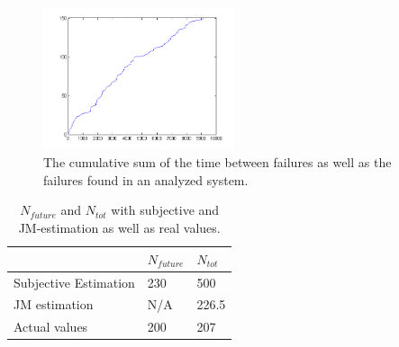 \begin{figure}[htb!]
\begin{center}
	\includegraphics[width=0.5\textwidth]{cumsumjmdata1plot.png}
\caption{The cumulative sum of the time between failures as well as the failures found in an analyzed system.}
\end{center}
\label{cumulativejmdata1}
\end{figure}

\begin{table}[!htb]
	\centering
	\caption{$N_{future}$ and $N_{tot}$ with subjective and JM-estimation as well as real values.}
	\label{jelinskimorandatable}	
    \begin{tabular}{|l|l|l|}
        \hline
        ~ & $N_{future}$ & $N_{tot}$ \\ \hline
        Subjective Estimation            & 230   & 500 		\\ 
        JM estimation                    & N/A   & 226.5	\\ 
        Actual values                    & 200 	 & 207		\\ 
        \hline
    \end{tabular}
\end{table}